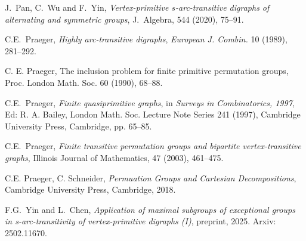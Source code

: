 \documentclass[11pt]{amsart}
\newcommand{\PSL}{\mathrm{PSL}}
\newcommand{\PSU}{\mathrm{PSU}}
\newcommand{\SL}{\mathrm{SL}}
\newcommand{\SU}{\mathrm{SU}}
\begin{document}
\begin{thebibliography}{}



 J.~Pan, C.~Wu and F.~Yin,
\emph {Vertex-primitive $s$-arc-transitive digraphs of alternating and symmetric groups},
J.~Algebra, 544 (2020), 75--91.






 C.E.~Praeger, \emph{Highly arc-transitive digraphs}, \emph{European J. Combin.} 10 (1989), 281--292.

 C. E. Praeger, The inclusion problem for finite primitive permutation groups, Proc. London Math. Soc. 60 (1990), 68--88.

 C.E.~Praeger, \emph{Finite quasiprimitive graphs}, in \emph{Surveys in Combinatorics, 1997}, Ed: R. A. Bailey, London Math. Soc. Lecture Note Series 241 (1997), Cambridge University Press, Cambridge, pp. 65--85.

C.E.~Praeger, \emph{Finite transitive permutation groups and bipartite vertex-transitive graphs}, Illinois Journal of Mathematics, 47 (2003), 461--475.

 C.E. Praeger, C. Schneider, \emph{Permuation Groups and Cartesian Decompositions}, Cambridge University Press, Cambridge, 2018.

 F.G.~Yin and L.~Chen, \emph{Application of maximal subgroups of exceptional groups in s-arc-transitivity of vertex-primitive digraphs (I)}, preprint, 2025. Arxiv: 2502.11670.



\end{thebibliography}
\end{document}
